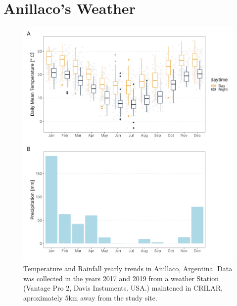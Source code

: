 \documentclass[msc,numbers,hidelinks]{coppe}
\begin{document}
  \hypertarget{anillacos-weather}{%
  \section{Anillaco's Weather}\label{anillacos-weather}}
  \begin{figure}[H]

  {\centering \includegraphics[width=1\linewidth]{../04_figures/appendix/plot_weather} 

  }

  \caption{Temperature  and Rainfall yearly trends in Anillaco, Argentina. Data was collected in the years 2017 and 2019 from a weather Station (Vantage Pro 2, Davis Instuments. USA.) maintened in CRILAR, aproximately 5km away from the study site.}\label{fig:appendix-weather}
  \end{figure}
  \pagebreak
\end{document}
